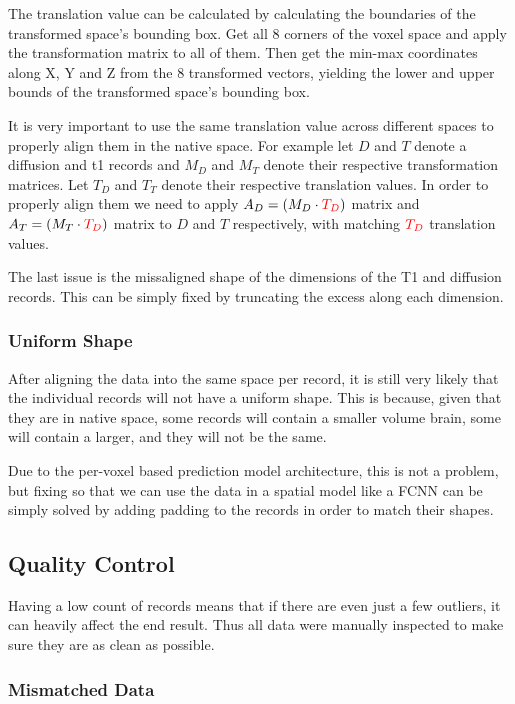 The translation value can be calculated by calculating the boundaries of the transformed space's bounding box. Get all 8 corners of the voxel space and apply the transformation matrix to all of them. Then get the min-max coordinates along X, Y and Z from the 8 transformed vectors, yielding the lower and upper bounds of the transformed space's bounding box.\par

It is very important to use the same translation value across different spaces to properly align them in the native space. For example let $D$ and $T$ denote a diffusion and t1 records and $M_D$ and $M_T$ denote their respective transformation matrices. Let $T_D$ and $T_T$ denote their respective translation values. In order to properly align them we need to apply $A_D = (M_D \cdot {\color{red}T_D})$ matrix and $A_T = (M_T \cdot {\color{red}T_D})$ matrix to $D$ and $T$ respectively, with matching ${\color{red}T_D}$ translation values.\par

The last issue is the missaligned shape of the dimensions of the T1 and diffusion records. This can be simply fixed by truncating the excess along each dimension.

\subsubsection{Uniform Shape}
After aligning the data into the same space per record, it is still very likely that the individual records will not have a uniform shape. This is because, given that they are in native space, some records will contain a smaller volume brain, some will contain a larger, and they will not be the same.\par
Due to the per-voxel based prediction model architecture, this is not a problem, but fixing so that we can use the data in a spatial model like a \ac{FCNN} can be simply solved by adding padding to the records in order to match their shapes.

\subsection{Quality Control}

Having a low count of records means that if there are even just a few outliers, it can heavily affect the end result. Thus all data were manually inspected to make sure they are as clean as possible.

\subsubsection{Mismatched Data}

